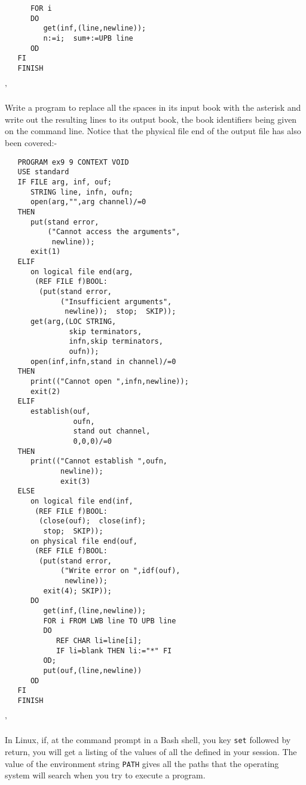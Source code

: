 \begin{exercise}
\begin{verbatim}
      FOR i
      DO
         get(inf,(line,newline));
         n:=i;  sum+:=UPB line
      OD
   FI 
   FINISH
\end{verbatim}
'
\item Write a program to replace all the spaces in its input book
with the asterisk and write out the resulting lines to its output
book, the book identifiers being given on the command line.
\ans Notice that the physical file end of the output file has also
been covered:-
\begin{verbatim}
   PROGRAM ex9 9 CONTEXT VOID
   USE standard
   IF FILE arg, inf, ouf;
      STRING line, infn, oufn;
      open(arg,"",arg channel)/=0
   THEN
      put(stand error,
          ("Cannot access the arguments",
           newline));
      exit(1)
   ELIF
      on logical file end(arg,
       (REF FILE f)BOOL:
        (put(stand error,
             ("Insufficient arguments",
              newline));  stop;  SKIP));
      get(arg,(LOC STRING,
               skip terminators,
               infn,skip terminators,
               oufn));
      open(inf,infn,stand in channel)/=0
   THEN
      print(("Cannot open ",infn,newline));
      exit(2)
   ELIF
      establish(ouf,
                oufn,
                stand out channel,
                0,0,0)/=0
   THEN
      print(("Cannot establish ",oufn,
             newline));
             exit(3)
   ELSE
      on logical file end(inf,
       (REF FILE f)BOOL:
        (close(ouf);  close(inf);
         stop;  SKIP));
      on physical file end(ouf,
       (REF FILE f)BOOL:
        (put(stand error,
             ("Write error on ",idf(ouf),
              newline));
         exit(4); SKIP));
      DO
         get(inf,(line,newline));
         FOR i FROM LWB line TO UPB line
         DO
            REF CHAR li=line[i];
            IF li=blank THEN li:="*" FI
         OD;
         put(ouf,(line,newline))
      OD
   FI 
   FINISH
\end{verbatim}
'
\end{exercise}

In Linux, if, at the command prompt in a Bash shell, you key
\verb|set| followed by return, you will get a listing of the values
of all the  defined in
your session. The value of the environment string \verb|PATH| gives
all the paths that the operating system will search when you try to
execute a program.

